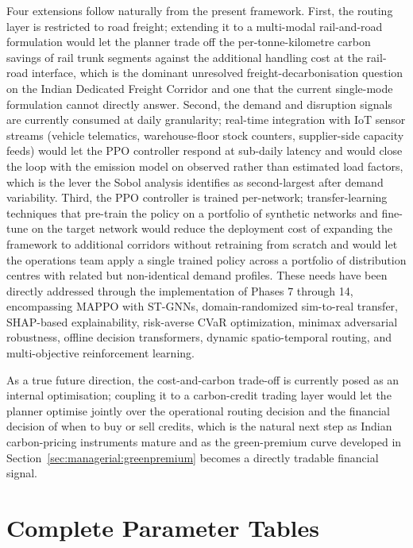 \documentclass[review,preprint,authoryear,12pt]{elsarticle}
\begin{document}
Four extensions follow naturally from the present framework. First,
the routing layer is restricted to road freight; extending it to a
multi-modal rail-and-road formulation would let the planner trade
off the per-tonne-kilometre carbon savings of rail trunk segments
against the additional handling cost at the rail-road interface,
which is the dominant unresolved freight-decarbonisation question on
the Indian Dedicated Freight Corridor and one that the current
single-mode formulation cannot directly answer. Second, the demand
and disruption signals are currently consumed at daily granularity;
real-time integration with IoT sensor streams (vehicle telematics,
warehouse-floor stock counters, supplier-side capacity feeds) would
let the PPO controller respond at sub-daily latency and would close
the loop with the emission model on observed rather than estimated
load factors, which is the lever the Sobol analysis identifies as
second-largest after demand variability. Third, the PPO controller
is trained per-network; transfer-learning techniques that pre-train
the policy on a portfolio of synthetic networks and fine-tune on the
target network would reduce the deployment cost of expanding the
framework to additional corridors without retraining from scratch
and would let the operations team apply a single trained policy
across a portfolio of distribution centres with related but
non-identical demand profiles. These needs have been directly addressed through the implementation of Phases 7 through 14, encompassing MAPPO with ST-GNNs, domain-randomized sim-to-real transfer, SHAP-based explainability, risk-averse CVaR optimization, minimax adversarial robustness, offline decision transformers, dynamic spatio-temporal routing, and multi-objective reinforcement learning. 

As a true future direction, the cost-and-carbon trade-off
is currently posed as an internal optimisation; coupling it to a
carbon-credit trading layer would let the planner optimise jointly
over the operational routing decision and the financial decision of
when to buy or sell credits, which is the natural next step as
Indian carbon-pricing instruments mature and as the green-premium
curve developed in Section~\ref{sec:managerial:greenpremium} becomes
a directly tradable financial signal.

\appendix

\section{Complete Parameter Tables}
\label{appendix:parameters}
\end{document}
